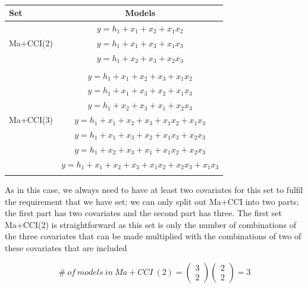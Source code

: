 \begin{table}
\centering
\caption{}
\begin{tabular}{lc} 
\toprule
Set & Models \\ 
\midrule
\multirow{3}{*}{Ma+CCI(2)} & $y=h_1+x_1+x_2+x_1x_2$\\ & $y=h_1+x_1+x_3+x_1x_3$\\ & $y=h_1+x_2+x_3+x_2x_3$\\ &  \\  
\multirow{7}{*}{Ma+CCI(3)} & $y=h_1+x_1+x_2+x_3+x_1x_2$\\ & $y=h_1+x_1+x_3+x_2+x_1x_3$\\ & $y=h_1+x_2+x_3+x_1+x_2x_3$\\ & $y=h_1+x_1+x_2+x_3+x_1x_2+x_1x_3$\\ & $y=h_1+x_1+x_3+x_2+x_1x_3+x_2x_3$\\ & $y=h_1+x_2+x_3+x_1+x_1x_2+x_2x_3$\\ & $y=h_1+x_1+x_2+x_3+x_1x_2+x_2x_3+x_1x_3$\\ & \\ 
\bottomrule
\end{tabular}
\end{table}

As in this case, we always need to have at least two covariates for this set to fulfil the requirement that we have set; we can only split out Ma+CCI into two parts; the first part has two covariates and the second part has three. The first set Ma+CCI(2) is straightforward as this set is only the number of combinations of the three covariates that can be made multiplied with the combinations of two of these covariates that are included

\noindent 
\[\#\ of\ models\ in\ Ma+CCI\ \left(2\right)=\left( \begin{array}{c}
3 \\ 
2 \end{array}
\right)\left( \begin{array}{c}
2 \\ 
2 \end{array}
\right)=3\] 

